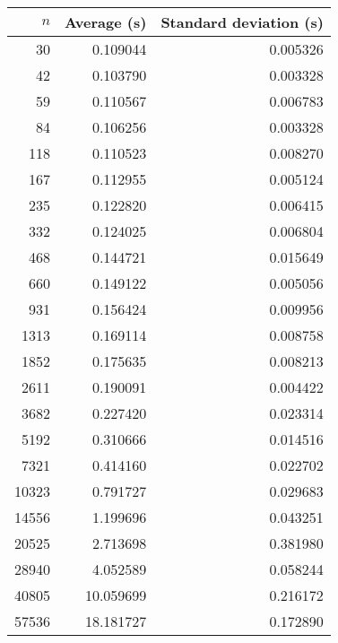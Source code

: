 \begin{tabular}{rrr}
$n$ & Average (s) & Standard deviation (s)\\\hline
30 & 0.109044 & 0.005326\\
42 & 0.103790 & 0.003328\\
59 & 0.110567 & 0.006783\\
84 & 0.106256 & 0.003328\\
118 & 0.110523 & 0.008270\\
167 & 0.112955 & 0.005124\\
235 & 0.122820 & 0.006415\\
332 & 0.124025 & 0.006804\\
468 & 0.144721 & 0.015649\\
660 & 0.149122 & 0.005056\\
931 & 0.156424 & 0.009956\\
1313 & 0.169114 & 0.008758\\
1852 & 0.175635 & 0.008213\\
2611 & 0.190091 & 0.004422\\
3682 & 0.227420 & 0.023314\\
5192 & 0.310666 & 0.014516\\
7321 & 0.414160 & 0.022702\\
10323 & 0.791727 & 0.029683\\
14556 & 1.199696 & 0.043251\\
20525 & 2.713698 & 0.381980\\
28940 & 4.052589 & 0.058244\\
40805 & 10.059699 & 0.216172\\
57536 & 18.181727 & 0.172890\\
\end{tabular}

